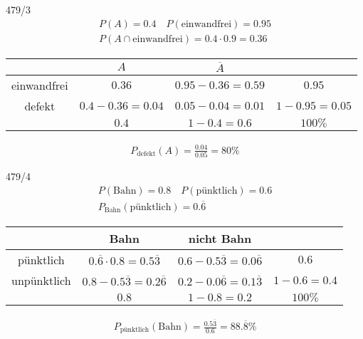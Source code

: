 \begin{exercise}{479/3}
  \begin{gather*}
    P(A) = 0.4 \quad P(\text{einwandfrei}) = 0.95 \\
    P(A \cap \text{einwandfrei}) = 0.4 \cdot 0.9 = 0.36
  \end{gather*}
  \begin{tabular}{c|c|c|c}
    & $A$ & $\overline{A}$ & \\ \hline
    einwandfrei & $0.36$ & $0.95 - 0.36 = 0.59$ & $0.95$ \\ \hline
    defekt & $0.4 - 0.36 = 0.04$ & $0.05 - 0.04 = 0.01$ & $1 - 0.95 = 0.05$ \\ \hline
    & $0.4$ & $1 - 0.4 = 0.6$ & $100\%$
  \end{tabular}
  \begin{gather*}
    P_\text{defekt}(A) = \frac{0.04}{0.05} = 80\%
  \end{gather*}
\end{exercise}
\begin{exercise}{479/4}
  \begin{gather*}
    P(\text{Bahn}) = 0.8 \quad P(\text{pünktlich}) = 0.6 \\
    P_\text{Bahn}(\text{pünktlich}) = 0.\overline{6}
  \end{gather*}
  \begin{tabular}{c|c|c|c}
    & Bahn & nicht Bahn & \\ \hline
    pünktlich & $0.\overline{6} \cdot 0.8 = 0.5\overline{3}$ & $0.6 - 0.5\overline{3} = 0.0\overline{6}$ & $0.6$ \\ \hline
    unpünktlich & $0.8 - 0.5\overline{3} = 0.2\overline{6}$ & $0.2 - 0.0\overline{6} = 0.1\overline{3}$ & $1 - 0.6 = 0.4$ \\ \hline
    & $0.8$ & $1 - 0.8 = 0.2$ & $100\%$
  \end{tabular}
  \begin{gather*}
    P_\text{pünktlich}(\text{Bahn}) = \frac{0.5\overline{3}}{0.6} = 88.\overline{8}\%
  \end{gather*}
\end{exercise}

